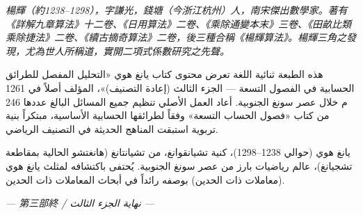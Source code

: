\documentclass[11pt,a4paper]{article}
\newcommand{\ar}[1]{\arabicfont\beginR #1\endR}
\begin{document}
\noindent
\begin{minipage}[t]{0.48\textwidth}
\textit{楊輝（約1238--1298），字謙光，錢塘（今浙江杭州）人，南宋傑出數學家。著有《詳解九章算法》十二卷、《日用算法》二卷、《乘除通變本末》三卷、《田畝比類乘除捷法》二卷、《續古摘奇算法》二卷，後三種合稱《楊輝算法》。楊輝三角之發現，尤為世人所稱道，實開二項式係數研究之先聲。}
\end{minipage}
\hfill
\begin{minipage}[t]{0.48\textwidth}
\arabicfont\beginR
هذه الطبعة ثنائية اللغة تعرض محتوى كتاب يانغ هوي «التحليل المفصل للطرائق الحسابية في الفصول التسعة --- الجزء الثالث (إعادة التصنيف)»، المؤلف أصلاً في 1261 م خلال عصر سونغ الجنوبية. أعاد العمل الأصلي تنظيم جميع المسائل البالغ عددها 246 من كتاب «فصول الحساب التسعة» وفقاً لطرائقها الحسابية الأساسية، مبتكراً بنية تربوية استبقت المناهج الحديثة في التصنيف الرياضي.

يانغ هوي (حوالي 1238--1298)، كنية تشيانقوانغ، من تشيانتانغ (هانغتشو الحالية بمقاطعة تشجيانغ)، عالم رياضيات بارز من عصر سونغ الجنوبية. يُحتفى باكتشافه لمثلث يانغ هوي (معاملات ذات الحدين) بوصفه رائداً في أبحاث المعاملات ذات الحدين.
\endR
\end{minipage}

\vspace{0.5cm}

\begin{flushright}
\textit{--- 第三部終 / \ar{نهاية الجزء الثالث} ---}
\end{flushright}
\end{document}
